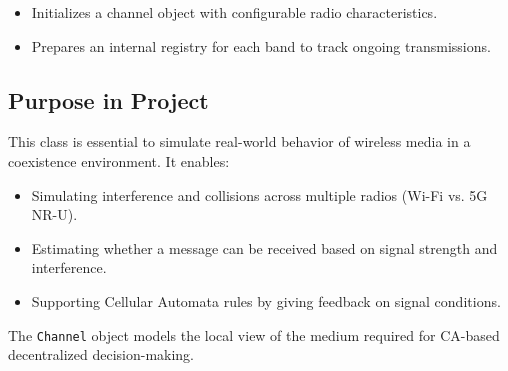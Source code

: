 \documentclass[12pt]{article}
\begin{document}
\begin{itemize}
  \item Initializes a channel object with configurable radio characteristics.
  \item Prepares an internal registry for each band to track ongoing transmissions.
\end{itemize}

\subsection*{Purpose in Project}
This class is essential to simulate real-world behavior of wireless media in a coexistence environment. It enables:

\begin{itemize}
  \item Simulating interference and collisions across multiple radios (Wi-Fi vs. 5G NR-U).
  \item Estimating whether a message can be received based on signal strength and interference.
  \item Supporting Cellular Automata rules by giving feedback on signal conditions.
\end{itemize}


The \texttt{Channel} object models the local view of the medium required for CA-based decentralized decision-making.
\end{document}
